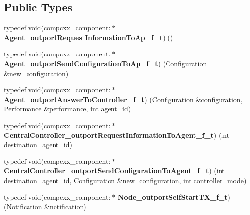 \subsection*{Public Types}
\begin{DoxyCompactItemize}
\item 
\mbox{\label{classcompcxx__component_ae77339bcc9d37cfd73c7e86d83543c61}} 
typedef void(compcxx\+\_\+component\+::$\ast$ {\bfseries Agent\+\_\+outport\+Request\+Information\+To\+Ap\+\_\+f\+\_\+t}) ()
\item 
\mbox{\label{classcompcxx__component_a2e6fd05abf2108270e0dc36fb77b8a2d}} 
typedef void(compcxx\+\_\+component\+::$\ast$ {\bfseries Agent\+\_\+outport\+Send\+Configuration\+To\+Ap\+\_\+f\+\_\+t}) (\hyperlink{structConfiguration}{Configuration} \&new\+\_\+configuration)
\item 
\mbox{\label{classcompcxx__component_a8be04622edac273e160bc18b3c8ebadc}} 
typedef void(compcxx\+\_\+component\+::$\ast$ {\bfseries Agent\+\_\+outport\+Answer\+To\+Controller\+\_\+f\+\_\+t}) (\hyperlink{structConfiguration}{Configuration} \&configuration, \hyperlink{structPerformance}{Performance} \&performance, int agent\+\_\+id)
\item 
\mbox{\label{classcompcxx__component_a96f2070a90e7f2b6b51ad972c5f58f38}} 
typedef void(compcxx\+\_\+component\+::$\ast$ {\bfseries Central\+Controller\+\_\+outport\+Request\+Information\+To\+Agent\+\_\+f\+\_\+t}) (int destination\+\_\+agent\+\_\+id)
\item 
\mbox{\label{classcompcxx__component_a7db4fd9662f71cf4ad302d6e9eec1efd}} 
typedef void(compcxx\+\_\+component\+::$\ast$ {\bfseries Central\+Controller\+\_\+outport\+Send\+Configuration\+To\+Agent\+\_\+f\+\_\+t}) (int destination\+\_\+agent\+\_\+id, \hyperlink{structConfiguration}{Configuration} \&new\+\_\+configuration, int controller\+\_\+mode)
\item 
\mbox{\label{classcompcxx__component_a5bc681af4779c999f76e3cfa9bd446b1}} 
typedef void(compcxx\+\_\+component\+::$\ast$ {\bfseries Node\+\_\+outport\+Self\+Start\+T\+X\+\_\+f\+\_\+t}) (\hyperlink{structNotification}{Notification} \&notification)

\end{DoxyCompactItemize}
